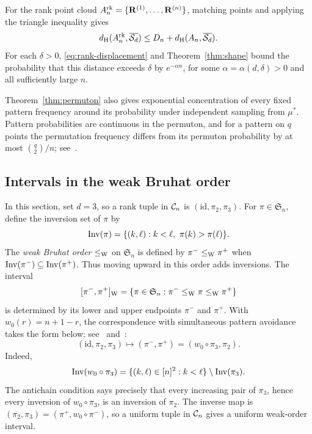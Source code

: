 \documentclass[11pt,letterpaper]{article}
\begin{document}
\begin{remark}\label{rem:rank-hausdorff}
      For the rank point cloud $A_n^{\mathrm{rk}}=\{\mathbf R^{(1)},\ldots,\mathbf R^{(n)}\}$, matching points and applying the triangle inequality gives
      \[
            d_{\rm H}(A_n^{\mathrm{rk}},\overline{\mathcal S_d})
            \le D_n+d_{\rm H}(A_n,\overline{\mathcal S_d}).
      \]
      For each $\delta>0$, \eqref{eq:rank-displacement} and Theorem~\ref{thm:shape} bound the probability that this distance exceeds $\delta$ by $e^{-\alpha n}$, for some $\alpha=\alpha(d,\delta)>0$ and all sufficiently large $n$.
\end{remark}

\begin{remark}\label{rem:pattern-concentration}
      Theorem~\ref{thm:permuton} also gives exponential concentration of every fixed pattern frequency around its probability under independent sampling from $\mu^\ast$. Pattern probabilities are continuous in the permuton, and for a pattern on $q$ points the permutation frequency differs from its permuton probability by at most $\binom{q}{2}/n$; see~\cite[Lemma~2.3 and Proposition~2.4]{BL}.
\end{remark}



\subsection{Intervals in the weak Bruhat order}

In this section, set $d=3$, so a rank tuple in $\mathcal C_n$ is $(\mathrm{id},\pi_2,\pi_3)$. For $\pi\in\mathfrak S_n$, define the inversion set of $\pi$ by
\[
      \Inv(\pi)=\{(k,\ell):k<\ell,\ \pi(k)>\pi(\ell)\}.
\]
The {\em weak Bruhat order} $\le_{\rm W}$ on $\mathfrak S_n$ is defined by $\pi^-\le_{\rm W}\pi^+$ when $\operatorname{Inv}(\pi^-)\subseteq\operatorname{Inv}(\pi^+)$. Thus moving upward in this order adds inversions. The interval
\[
      [\pi^-,\pi^+]_{\rm W}=\{\pi\in\mathfrak S_n:\pi^-\le_{\rm W}\pi\le_{\rm W}\pi^+\}
\]
is determined by its lower and upper endpoints $\pi^-$ and $\pi^+$. With $w_0(r)=n+1-r$, the correspondence with simultaneous pattern avoidance takes the form below; see~\cite{GP} and~\cite[Proposition~5]{BM}:
\begin{equation}\label{eq:interval-map}
      (\mathrm{id},\pi_2,\pi_3)\longmapsto (\pi^-,\pi^+)=(w_0\circ\pi_3,\pi_2).
\end{equation}
Indeed,
\[
      \operatorname{Inv}(w_0\circ\pi_3)=\{(k,\ell)\in[n]^2:k<\ell\}\setminus\operatorname{Inv}(\pi_3).
\]
The antichain condition says precisely that every increasing pair of $\pi_3$, hence every inversion of $w_0\circ\pi_3$, is an inversion of $\pi_2$. The inverse map is $(\pi_2,\pi_3)=(\pi^+,w_0\circ\pi^-)$, so a uniform tuple in $\mathcal C_n$ gives a uniform weak-order interval.
\end{document}

